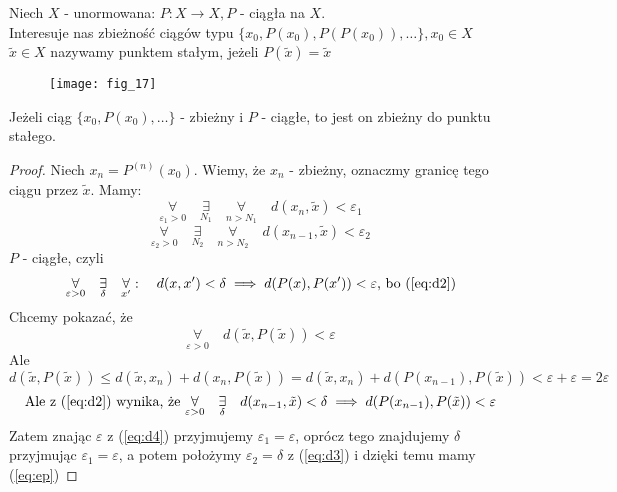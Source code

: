 \documentclass[../main.tex]{subfiles}
\begin{document}
\begin{definicja}
Niech $X$ - unormowana: $P: X\to X, P$ - ciągła na $X$.\\
Interesuje nas zbieżność ciągów typu $\{x_0, P(x_0), P(P(x_0)),\dots \}, x_0\in X$\\
    $\tilde x \in X$ nazywamy punktem stałym, jeżeli $P(\tilde x) = \tilde x$
\end{definicja}

\begin{figure}[h]
    \centering
    \texttt{[image: fig\_17]}
\end{figure}

\begin{tw}
Jeżeli ciąg $\{x_0, P(x_0), \dots \} $ - zbieżny i $P$ - ciągłe, to jest on zbieżny do punktu stałego.
\end{tw}

\begin{proof}

Niech $x_n = P^{(n)} (x_0)$. Wiemy, że $x_n$ - zbieżny, oznaczmy granicę tego ciągu przez $\tilde x$.
Mamy:
\begin{equation}\label{eq:d2}
    \underset{\varepsilon_1 > 0}{\forall}\quad \underset{N_1}{\exists}\quad \underset{n>N_1}{\forall}\quad d(x_n,\tilde x) < \varepsilon_1
\end{equation}
\begin{equation}\label{eq:d3}
    \underset{\varepsilon_2>0}{\forall}\quad \underset{N_2}{\exists}\quad \underset{n>N_2}{\forall}\quad d(x_{n-1},\tilde x) < \varepsilon_2
\end{equation}
$P$ - ciągłe, czyli
    \[
        \underset{\varepsilon>0}{\forall}\quad \underset{\delta}{\exists}\quad \underset{x'}{\forall}:\quad d(x,x')<\delta \implies d(P(x),P(x'))<\varepsilon \text{, bo (\ref{eq:d2})}
    \]
Chcemy pokazać, że
\begin{equation}\label{eq:d4}
    \underset{\varepsilon>0}{\forall}\quad d(\tilde x,P(\tilde x))<\varepsilon
\end{equation}
Ale
\begin{equation}\label{eq:ep}
    d(\tilde x, P(\tilde x)) \leq d(\tilde x,x_n) + d(x_n, P(\tilde x)) = d(\tilde x, x_n) + d(P(x_{n-1}),P(\tilde x)) < \varepsilon + \varepsilon = 2 \varepsilon
\end{equation}
\begin{equation}
    \text{Ale z (\ref{eq:d2}) wynika, że }
    \underset{\varepsilon>0}{\forall}\quad \underset{\delta}{\exists}\quad d(x_{n-1},\tilde x) < \delta \implies d(P(x_{n-1}),P(\tilde x)) < \varepsilon
\end{equation}
Zatem znając $\varepsilon$ z (\ref{eq:d4}) przyjmujemy $\varepsilon_1 = \varepsilon$, oprócz tego znajdujemy $\delta$ przyjmując $\varepsilon_1 = \varepsilon$, a potem położymy $\varepsilon_2 = \delta$ z (\ref{eq:d3}) i dzięki temu mamy (\ref{eq:ep})
\end{proof}
\end{document}
